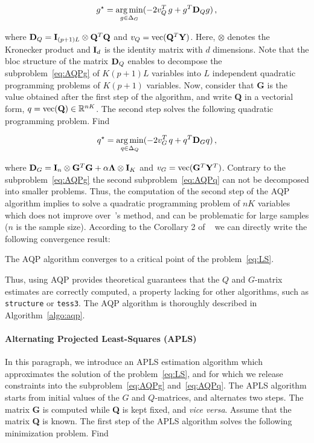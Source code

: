 \begin{equation}
\begin{aligned}
g^\star = \underset{g \in \Delta_G}{\arg \min}  ( -2  v^T_Q \, g + g^T {\bf D}_Q g ) \, ,  
\end{aligned}
\label{eq:AQPg}
\end{equation}

\noindent where ${\bf D}_Q = {\bf I}_{(p+1)L} \otimes {\bf Q}^T {\bf Q}$ and $v_Q = {\rm vec}({\bf Q}^T {\bf Y})$. Here, $\otimes$ denotes the Kronecker product and ${\bf I}_d$ is the identity matrix with $d$ dimensions. Note that the bloc structure of the matrix ${\bf D}_Q$ enables to decompose the subproblem~\eqref{eq:AQPg} of $K(p + 1)L$ variables into $L$ independent quadratic programming problems of $K(p + 1)$ variables. Now, consider that {\bf G} is the value obtained after the first step of the algorithm, and write {\bf Q} in a vectorial form, $q = {\rm vec({\bf Q})} \in \mathbb{R}^{nK}$. The second step solves the following quadratic programming problem. Find

\begin{equation}
\begin{aligned}
q^\star = \underset{q \in \Delta_Q}{\arg \min} ( -2 v^T_G \, q + q^T {\bf D}_G q ) \,  ,
\end{aligned}
\label{eq:AQPq}
\end{equation}

\noindent where ${\bf D}_G = {\bf I}_{n} \otimes {\bf G}^T {\bf G } + \alpha {\bf \Lambda}  \otimes {\bf I}_K$ and $v_G = {\rm vec}({\bf G}^T{\bf  Y}^T)$. Contrary to the subproblem~\eqref{eq:AQPg} the second subproblem~\eqref{eq:AQPq} can not be decomposed into smaller problems. Thus, the computation of the second step of the AQP algorithm implies to solve a quadratic programming problem of $nK$ variables which does not improve over~\cite{Caye2016}'s method, and can be problematic for large samples ($n$ is the sample size). According to the Corollary 2 of ~\cite{Grippo2000} we can directly write the following convergence result:
\begin{thm}
	The AQP algorithm converges to a critical point of the problem~\eqref{eq:LS}.
\end{thm}
Thus, using AQP provides theoretical guarantees that the $Q$ and $G$-matrix estimates are correctly computed, a property lacking for other algorithms, such as {\tt structure} or {\tt tess3}. The AQP algorithm is thoroughly described in Algorithm~\ref{algo:aqp}.

\paragraph{Alternating Projected Least-Squares (APLS)} In this paragraph, we introduce an APLS estimation algorithm which approximates the solution of the problem~\eqref{eq:LS}, and for which we release constraints into the subproblem~\eqref{eq:AQPg} and~\eqref{eq:AQPq}. The APLS algorithm starts from initial values of the $G$ and $Q$-matrices, and alternates two steps. The matrix {\bf G} is computed  while  {\bf Q} is kept fixed, and {\it vice versa}. Assume that the matrix {\bf Q} is known. The first step of the APLS algorithm solves the following minimization problem. Find 

